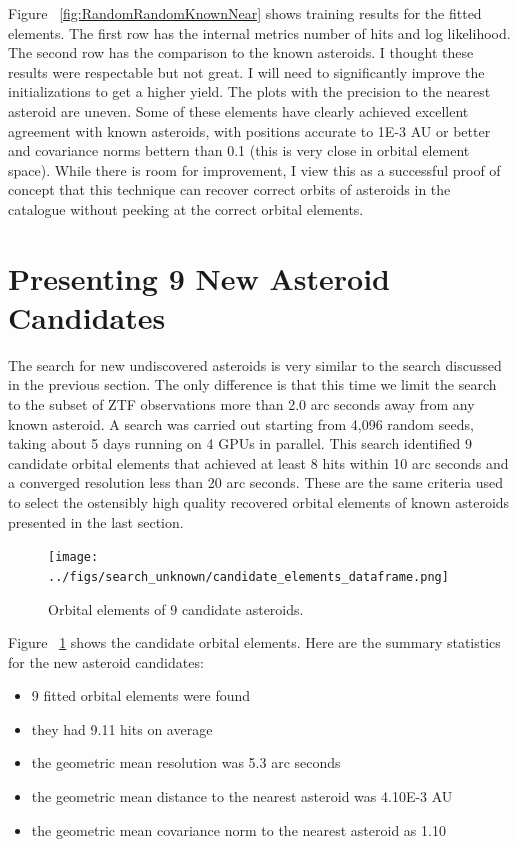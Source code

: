 Figure ~\ref{fig:RandomRandomKnownNear} shows training results for the fitted elements.
The first row has the internal metrics number of hits and log likelihood.
The second row has the comparison to the known asteroids.
I thought these results were respectable but not great.
I will need to significantly improve the initializations to get a higher yield.
The plots with the precision to the nearest asteroid are uneven.  
Some of these elements have clearly achieved excellent agreement with known asteroids, 
with positions accurate to 1E-3 AU or better and covariance norms bettern than 0.1 (this is very close in orbital element space).
While there is room for improvement, I view this as a successful proof of concept that this technique can recover correct orbits of asteroids 
in the catalogue without peeking at the correct orbital elements.

\section{Presenting 9 New Asteroid Candidates}
\label{section_results_unknown_ast}
The search for new undiscovered asteroids is very similar to the search discussed in the previous section.
The only difference is that this time we limit the search to the subset of ZTF observations more than 2.0
arc seconds away from any known asteroid.
A search was carried out starting from 4,096 random seeds, taking about 5 days running on 4 GPUs in parallel.
This search identified 9 candidate orbital elements that achieved at least 8 hits within 10 arc seconds
and a converged resolution less than 20 arc seconds.
These are the same criteria used to select the ostensibly high quality recovered orbital elements of known asteroids presented in the last section.

\begin{figure}[h]
\begin{center}
\texttt{[image: ../figs/search\_unknown/candidate\_elements\_dataframe.png]}
\end{center}
\caption{Orbital elements of 9 candidate asteroids.}
\label{fig:CandidateOrbitalElements}
\end{figure}

Figure ~\ref{fig:CandidateOrbitalElements} shows the candidate orbital elements.
Here are the summary statistics for the new asteroid candidates:
\begin{itemize}
\item 9 fitted orbital elements were found
\item they had 9.11 hits on average
\item the geometric mean resolution was 5.3 arc seconds
\item the geometric mean distance to the nearest asteroid was 4.10E-3 AU
\item the geometric mean covariance norm to the nearest asteroid as 1.10
\end{itemize}

